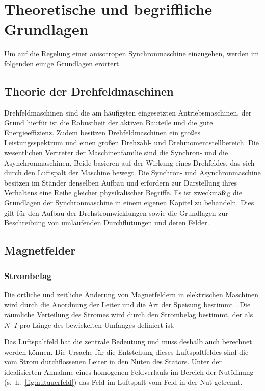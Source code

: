 
\chapter{Theoretische und begriffliche Grundlagen}\label{cha:grundlagen}

Um auf die Regelung einer anisotropen Synchronmaschine einzugehen, werden im folgenden einige Grundlagen erörtert.

\section{Theorie der Drehfeldmaschinen}\label{sec:grund-drehfeld}

Drehfeldmaschinen sind die am häufigsten eingesetzten Antriebsmaschinen, der Grund hierfür ist die Robustheit der aktiven Bauteile und die gute Energieeffizienz.
Zudem besitzen Drehfeldmaschinen ein großes Leistungsspektrum und einen großen Drehzahl- und Drehmomentstellbereich.
Die wesentlichen Vertreter der Maschinenfamilie sind die Synchron- und die Asynchronmaschinen.
Beide basieren auf der Wirkung eines Drehfeldes, das sich durch den Luftspalt der Maschine bewegt.
Die Synchron- und Asynchronmaschine besitzen im Ständer denselben Aufbau und erfordern zur Darstellung ihres Verhaltens eine Reihe gleicher physikalischer Begriffe.
Es ist zweckmäßig die Grundlagen der Synchronmaschine in einem eigenen Kapitel zu behandeln.
Dies gilt \insb für den Aufbau der Drehstromwicklungen sowie die Grundlagen zur Beschreibung von umlaufenden Durchflutungen und deren Felder.

\section{Magnetfelder}



\subsection{Strombelag}

Die örtliche und zeitliche Änderung von Magnetfeldern in elektrischen Maschinen wird durch die Anordnung der Leiter und die Art der Speisung bestimmt \autocite[S~199]{hofmann2013}.
Die räumliche Verteilung des Stromes wird durch den Strombelag bestimmt, der als $N\cdot I$ pro Länge des bewickelten Umfanges definiert ist.

Das Luftspaltfeld hat die zentrale Bedeutung und muss deshalb auch berechnet werden können.
Die Ursache für die Entstehung dieses Luftspaltfeldes sind die vom Strom durchflossenen Leiter in den Nuten des Stators.
Unter der idealisierten Annahme eines homogenen Feldverlaufs im Bereich der Nutöffnung (s.\ h.\ \autoref{fig:nutquerfeld}) das Feld im Luftspalt vom Feld in der Nut getrennt.


